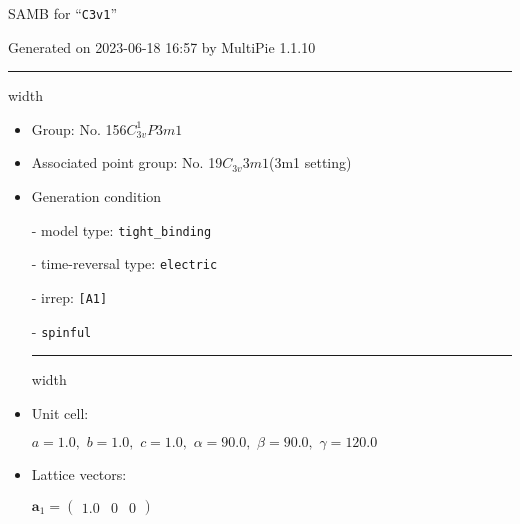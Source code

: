 \documentclass[fleqn,10pt,landscape]{article}
\begin{document}
\setcounter{MaxMatrixCols}{16}

\setlength{\baselineskip}{16pt}
\footnotesize
\begin{center}
\LARGE
SAMB for ``\texttt{C3v1}''
\end{center}
\begin{flushright}
Generated on 2023-06-18 16:57 by MultiPie 1.1.10
\end{flushright}
\vspace{1cm}


 \hfil \hrule height 1mm width \textwidth \hfil

\begin{itemize}
\item Group: No. 156\quad$C_{3v}^{1}$\quad$P3m1$\quad[ trigonal ]

\item Associated point group: No. 19\quad$C_{3v}$\quad$3m1$\quad(3m1 setting)\quad[ trigonal ]

\vspace{5mm}

\item Generation condition

\quad - model type: \texttt{tight_binding}

\quad - time-reversal type: \texttt{electric}

\quad - irrep: \texttt{[A1]}

\quad - \texttt{spinful}


 \hfil \hrule height 1mm width \textwidth \hfil

\item Unit cell:

\quad $a=1.0,\,\, b=1.0,\,\, c=1.0,\,\, \alpha=90.0,\,\, \beta=90.0,\,\, \gamma=120.0$

\item Lattice vectors:

\quad $\bm{a}_1=\begin{pmatrix} 1.0 & 0 & 0 \end{pmatrix}$


\end{itemize}
\end{document}

